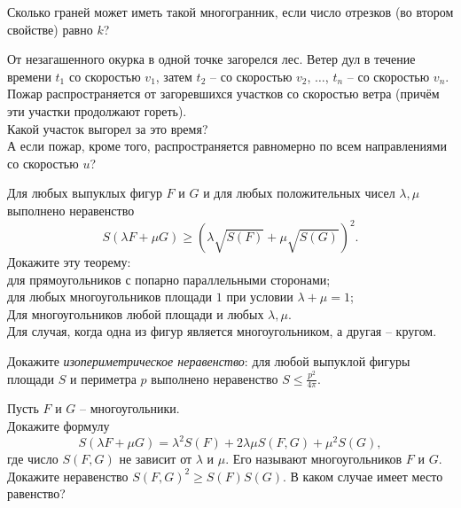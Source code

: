 \documentclass[a4paper,12pt]{article}
\begin{document}
 Сколько граней может иметь такой многогранник, если число отрезков (во втором свойстве) равно $k$?

 От незагашенного окурка в одной точке загорелся лес. Ветер дул в течение времени $t_1$ со скоростью $v_1$, затем $t_2$ -- со скоростью $v_2$, $\ldots$, $t_n$ -- со скоростью $v_n$. Пожар распространяется от загоревшихся участков со скоростью ветра (причём эти участки продолжают гореть).\\
 Какой участок выгорел за это время?\\  А если пожар, кроме того, распространяется равномерно по всем направлениями со скоростью $u$?

 Для любых выпуклых фигур $F$ и $G$ и для любых положительных чисел $\lambda, \mu$ выполнено неравенство $$S(\lambda F + \mu G) \geqslant (\lambda \sqrt{S(F)}+\mu \sqrt{S(G)})^2.$$ Докажите эту теорему:\\  для прямоугольников с попарно параллельными сторонами;\\  для любых многоугольников площади $1$ при условии $\lambda+\mu=1$;\\  Для многоугольников любой площади и любых $\lambda,\mu$.\\  Для случая, когда одна из фигур является многоугольником, а другая -- кругом.

 Докажите \emph{изопериметрическое неравенство}: для любой выпуклой фигуры площади $S$ и периметра $p$ выполнено неравенство $S \leqslant \frac{p^2}{4\pi}$.

 Пусть $F$ и $G$ -- многоугольники. \\  Докажите формулу $$S(\lambda F + \mu G) = \lambda^2 S(F)+2\lambda \mu S(F,G)+\mu^2 S(G),$$ где число $S(F,G)$ не зависит от $\lambda$ и $\mu$. Его называют  многоугольников $F$ и $G$.
 Докажите неравенство $S(F,G)^2 \geqslant S(F)S(G)$. В каком случае имеет место равенство?




\end{document}
